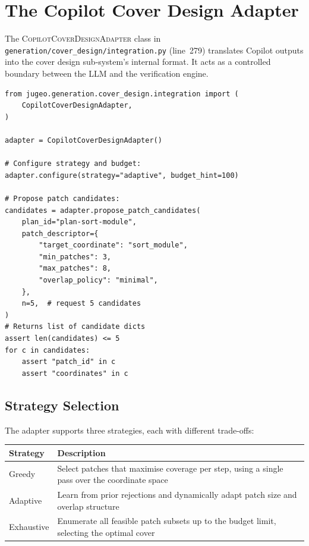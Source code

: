 \documentclass[11pt]{article}
\newcommand{\CovAdapt}{\textsc{CopilotCoverDesignAdapter}}
\begin{document}
\section{The Copilot Cover Design Adapter}\label{sec:adapter}

\begin{definition}\label{def:adapter}
The \CovAdapt{} class in \texttt{generation/cover\_design/integration.py}
(line~279) translates Copilot outputs into the cover design sub-system's
internal format.  It acts as a controlled boundary between the LLM and the
verification engine.
\end{definition}

\begin{lstlisting}[style=jugeo-python]
from jugeo.generation.cover_design.integration import (
    CopilotCoverDesignAdapter,
)

adapter = CopilotCoverDesignAdapter()

# Configure strategy and budget:
adapter.configure(strategy="adaptive", budget_hint=100)

# Propose patch candidates:
candidates = adapter.propose_patch_candidates(
    plan_id="plan-sort-module",
    patch_descriptor={
        "target_coordinate": "sort_module",
        "min_patches": 3,
        "max_patches": 8,
        "overlap_policy": "minimal",
    },
    n=5,  # request 5 candidates
)
# Returns list of candidate dicts
assert len(candidates) <= 5
for c in candidates:
    assert "patch_id" in c
    assert "coordinates" in c
\end{lstlisting}

\subsection{Strategy Selection}

The adapter supports three strategies, each with different trade-offs:

\begin{center}
\begin{tabular}{lp{7cm}}
\toprule
\textbf{Strategy} & \textbf{Description} \\
\midrule
Greedy     & Select patches that maximise coverage per step, using a
             single pass over the coordinate space \\
Adaptive   & Learn from prior rejections and dynamically adapt patch
             size and overlap structure \\
Exhaustive & Enumerate all feasible patch subsets up to the budget
             limit, selecting the optimal cover \\
\bottomrule
\end{tabular}
\end{center}
\end{document}
